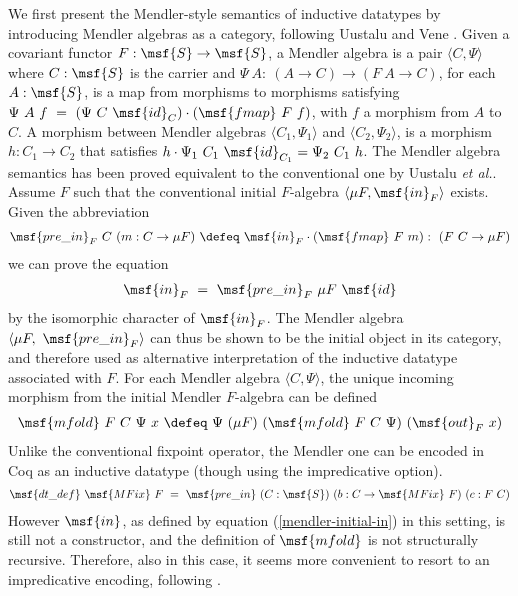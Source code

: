 \documentclass[submission,copyright,creativecommons]{eptcs}
\begin{document}
We first present the Mendler-style semantics of inductive datatypes by
introducing Mendler algebras as a category, following Uustalu and Vene
\cite{UustaluV99}. Given a covariant functor $F: \msf{S} \to \msf{S}
$, a Mendler algebra is a pair $\langle C, \Psi \rangle$ where $C:
\msf{S}$ is the carrier and $\Psi \ A: \ (A \to C) \to (F \ A \to C)
$, for each $A: \msf{S}$, is a map from morphisms to morphisms
satisfying $ \Psi \ A \ f \ = \ (\Psi \ C \ \msf{id}_C) \cdot
(\msf{fmap} \ F \ f)$, with $f$ a morphism from $A$ to $C$. A morphism
between Mendler algebras $\langle C_1, \Psi_1 \rangle$ and $\langle
C_2, \Psi_2 \rangle$, is a morphism $h: C_1 \to C_2$ that satisfies $h
\cdot \Psi_1 \ C_1 \ \msf{id}_{C_1} = \Psi_2 \ C_1 \ h$. The Mendler
algebra semantics has been proved equivalent to the conventional one
by Uustalu \emph{et al.}.
Assume $F$ such that the conventional initial $F$-algebra $\langle \mu
F, \msf{in}_F \rangle$ exists. Given the abbreviation
\begin{gather}  \msf{pre\_in}_F \ C \ (m: C \to \mu F) \ \defeq \ \msf{in}_F \cdot
(\msf{fmap} \ F \ m) : \ (F \ C \to \mu F)  \end{gather} 
we can prove the equation 
\begin{gather}  \label{mendler-initial-in}
\msf{in}_F \ = \ \msf{pre\_in}_F \ \mu F \ \msf{id} \end{gather}
by the isomorphic character of $\msf{in}_F$. 
The Mendler algebra $\langle \mu F, \ \msf{pre\_in}_F \rangle$ can
thus be shown to be the initial object in its category, and therefore
used as alternative interpretation of the inductive datatype
associated with $F$. For each Mendler algebra $\langle C, \Psi \rangle
$, the unique incoming morphism from the initial Mendler $F$-algebra
can be defined
\begin{gather}  \msf{mfold} \ F \ C \ \Psi \ x \ \defeq \ \Psi
\ (\mu F) \ (\msf{mfold} \ F \ C \ \Psi) \ (\msf{out}_F \ x) \end{gather} 
Unlike the conventional fixpoint operator, the Mendler one can be
encoded in Coq as an inductive datatype (though using the
impredicative option).
\begin{gather}  
\msf{dt\_def} \ \msf{MFix} \ F \ = \ \msf{pre\_in} \ (C: \msf{S})
\ (b: C \to \msf{MFix} \ F) \ (c: F \ C)
 \end{gather} 
However $\msf{in}$, as defined by equation (\ref{mendler-initial-in})
in this setting, is still not a constructor, and the definition of
$\msf{mfold}$ is not structurally recursive. Therefore, also in this
case, it seems more convenient to resort to an impredicative encoding,
following \cite{Mendler91,Dela13}.
\end{document}
